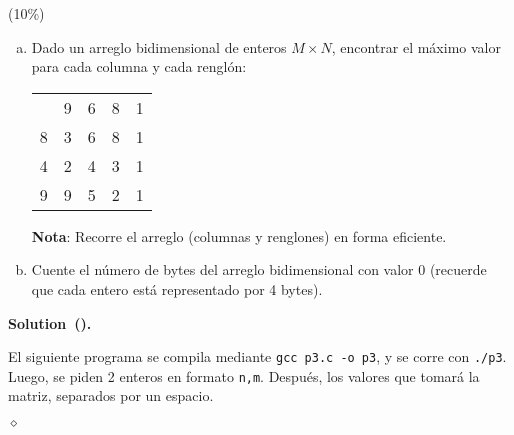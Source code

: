 \documentclass{article}
\theoremstyle{problemstyle}
\newenvironment{solution}[2]{%
  \begin{mdframed}[linewidth=0.8pt,linecolor=Gray,backgroundcolor=Gray!5,roundcorner=5pt, nobreak=#2]%
    \noindent\textbf{Solution\if\relax\detokenize{#1}\relax\else~(#1)\fi.}%
}{%
\hfill $ \diamond $ 
  \end{mdframed}%
}
\begin{document}
\begin{problem}
(10\%)
\begin{enumerate}[a)]
	\item Dado un arreglo bidimensional de enteros $ M\times N $, encontrar el m\'aximo valor para cada columna y cada rengl\'on:
	      \setlength\doublerulesep{0.5pt}
	      \begin{center}
		      \begin{tabular}[c]{|c||c|c|c|c|}
			      \hline
			        & 9 & 6 & 8 & 1 \\
			      \hhline{|=#=|=|=|=|}
			      8 & 3 & 6 & 8 & 1 \\
			      \hline
			      4 & 2 & 4 & 3 & 1 \\
			      \hline
			      9 & 9 & 5 & 2 & 1 \\
			      \hline
		      \end{tabular}
	      \end{center}
	      \textbf{Nota}: Recorre el arreglo (columnas y renglones) en forma eficiente.

	\item Cuente el n\'umero de bytes del arreglo bidimensional con valor 0 (recuerde que cada entero est\'a representado por 4 bytes).
\end{enumerate}

\end{problem}
\begin{solution}{}{false}
  El siguiente programa se compila mediante \texttt{gcc p3.c -o p3}, y se corre con \texttt{./p3}. Luego, se piden 2 enteros en formato \texttt{n,m}. Despu\'es, los valores que tomar\'a la matriz, separados por un espacio.
	
\end{solution}
\end{document}
